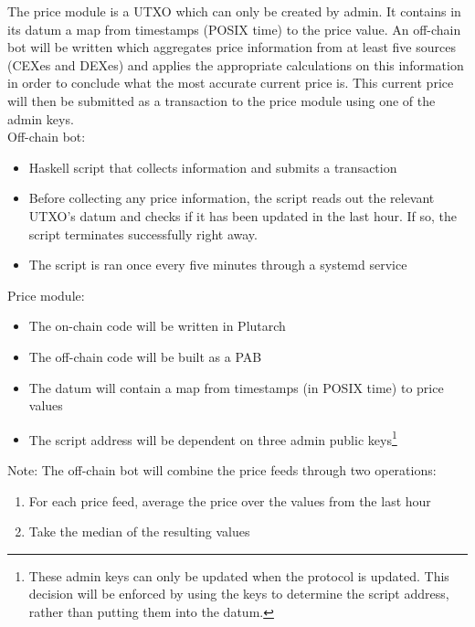 \documentclass{article} %
\begin{document}
The price module is a UTXO which can only be created by admin.
It contains in its datum a map from timestamps (POSIX time) to the price value.
An off-chain bot will be written which aggregates price information from at
least five sources (CEXes and DEXes) and applies the appropriate calculations on
this information in order to conclude what the most accurate current price is.
This current price will then be submitted as a transaction to the price module
using one of the admin keys. \\

Off-chain bot:
\begin{itemize}
  \item Haskell script that collects information and submits a transaction
  \item Before collecting any price information, the script reads out the
    relevant UTXO's datum and checks if it has been updated in the last hour. If
    so, the script terminates successfully right away.
  \item The script is ran once every five minutes through a systemd service
\end{itemize}

Price module:
\begin{itemize}
  \item The on-chain code will be written in Plutarch
  \item The off-chain code will be built as a PAB
  \item The datum will contain a map from timestamps (in POSIX time) to price
    values
  \item The script address will be dependent on three admin public
    keys\footnote{
      These admin keys can only be updated when the protocol is updated.
      This decision will be enforced by using the keys to determine the script
      address, rather than putting them into the datum.
    }
\end{itemize}

Note: The off-chain bot will combine the price feeds through two operations:
\begin{enumerate}
  \item For each price feed, average the price over the values from the last
    hour
  \item Take the median of the resulting values
\end{enumerate}
\end{document}
